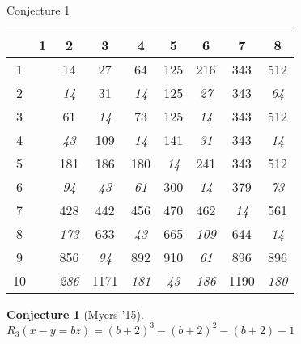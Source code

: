 \documentclass{beamer}
\newtheorem{conjecture}[theorem]{Conjecture}
\begin{document}
\begin{frame}{Conjecture 1}
\begin{center}
	\begin{tabular}{c|cccccccc}
		\diagbox{$b$}{$a$} & 1 & 2 & 3 & 4 &5&6&7&8\\
		\hline
		1 & {\color{red}{14}} & 14 & 27 & 64 &125 &216 & 343 & 512\\
		2 & {\color{red}{43}} & \textit{14} & 31 & \textit{14} &125 &\textit{27} &343&\textit{64} \\
		3 & {\color{red}{94}} & 61 & \textit{14} & 73 &125&\textit{14}&343&512\\
		4 & {\color{red}{173}} & \textit{43} & 109 & \textit{14} &141&\textit{31}&343&\textit{14} \\
		5 & {\color{red}{286}} & 181 & 186 & 180 &\textit{14} &241 & 343 & 512\\
		6 & {\color{red}{439}} & \textit{94} & \textit{43}  & \textit{61} &300&\textit{14}& 379 &\textit{73}\\
		7 & {\color{red}{638}} & 428 & 442 & 456 &470&462 &\textit{14}&561\\
		8 & {\color{red}{889}} & \textit{173} & 633 & \textit{43}&665&\textit{109}& 644 &\textit{14}\\
		9 & {\color{red}{1198}} & 856 & \textit{94}& 892 & 910 & \textit{61} & 896 & 896\\
		10 & {\color{red}{1571}} & \textit{286} & 1171 & \textit{181} &\textit{43}& \textit{186} & 1190 &\textit{180}
	\end{tabular}
\end{center}
\begin{conjecture}[Myers '15]
	$R_3(x-y = bz) = (b+2)^3 - (b+2)^2 - (b+2) - 1$
\end{conjecture}
\end{frame}
\end{document}
